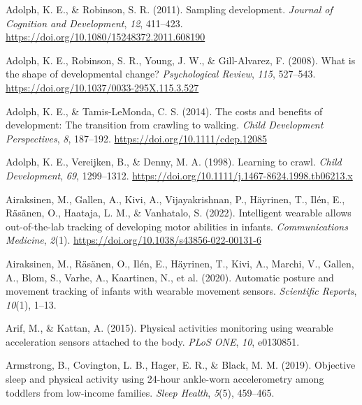 \documentclass[
  man]{apa6}
\newlength{\cslhangindent}
\newlength{\cslentryspacingunit} %
\newenvironment{CSLReferences}[2] %
 {%
  \setlength{\parindent}{0pt}
  \ifodd #1
  \let\oldpar\par
  \def\par{\hangindent=\cslhangindent\oldpar}
  \fi
  \setlength{\parskip}{#2\cslentryspacingunit}
 }%
 {}
\begin{document}
\hypertarget{refs}{}
\begin{CSLReferences}{1}{0}
\leavevmode{}%
Adolph, K. E., \& Robinson, S. R. (2011). Sampling development. \emph{Journal of Cognition and Development}, \emph{12}, 411--423. \url{https://doi.org/10.1080/15248372.2011.608190}

\leavevmode{}%
Adolph, K. E., Robinson, S. R., Young, J. W., \& Gill-Alvarez, F. (2008). What is the shape of developmental change? \emph{Psychological Review}, \emph{115}, 527--543. \url{https://doi.org/10.1037/0033-295X.115.3.527}

\leavevmode{}%
Adolph, K. E., \& Tamis-LeMonda, C. S. (2014). The costs and benefits of development: The transition from crawling to walking. \emph{Child Development Perspectives}, \emph{8}, 187--192. \url{https://doi.org/10.1111/cdep.12085}

\leavevmode{}%
Adolph, K. E., Vereijken, B., \& Denny, M. A. (1998). Learning to crawl. \emph{Child Development}, \emph{69}, 1299--1312. \url{https://doi.org/10.1111/j.1467-8624.1998.tb06213.x}

\leavevmode{}%
Airaksinen, M., Gallen, A., Kivi, A., Vijayakrishnan, P., Häyrinen, T., Ilén, E., Räsänen, O., Haataja, L. M., \& Vanhatalo, S. (2022). Intelligent wearable allows out-of-the-lab tracking of developing motor abilities in infants. \emph{Communications Medicine}, \emph{2}(1). \url{https://doi.org/10.1038/s43856-022-00131-6}

\leavevmode{}%
Airaksinen, M., Räsänen, O., Ilén, E., Häyrinen, T., Kivi, A., Marchi, V., Gallen, A., Blom, S., Varhe, A., Kaartinen, N., et al. (2020). Automatic posture and movement tracking of infants with wearable movement sensors. \emph{Scientific Reports}, \emph{10}(1), 1--13.

\leavevmode{}%
Arif, M., \& Kattan, A. (2015). Physical activities monitoring using wearable acceleration sensors attached to the body. \emph{{PLoS ONE}}, \emph{10}, e0130851.

\leavevmode{}%
Armstrong, B., Covington, L. B., Hager, E. R., \& Black, M. M. (2019). Objective sleep and physical activity using 24-hour ankle-worn accelerometry among toddlers from low-income families. \emph{Sleep Health}, \emph{5}(5), 459--465.


\end{CSLReferences}
\end{document}
